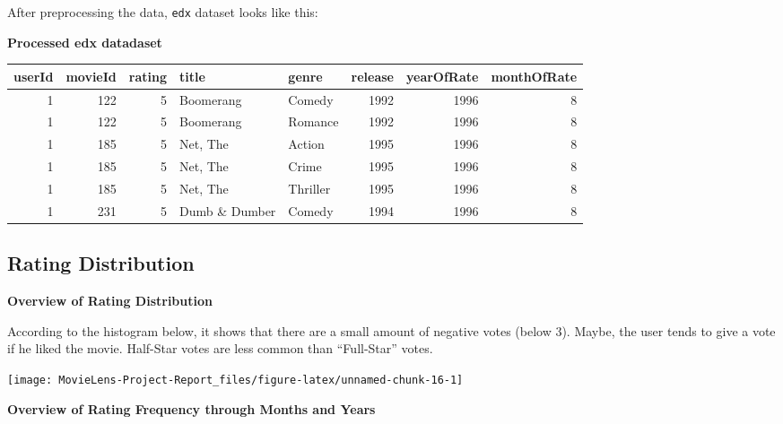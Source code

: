 \documentclass[
]{article}
\begin{document}
After preprocessing the data, \texttt{edx} dataset looks like this:

\textbf{Processed edx datadaset}

\begin{table}
\centering\begingroup\fontsize{10}{12}\selectfont

\begin{tabular}{r|r|r|l|l|r|r|r}
\hline
userId & movieId & rating & title & genre & release & yearOfRate & monthOfRate\\
\hline
1 & 122 & 5 & Boomerang & Comedy & 1992 & 1996 & 8\\
\hline
1 & 122 & 5 & Boomerang & Romance & 1992 & 1996 & 8\\
\hline
1 & 185 & 5 & Net, The & Action & 1995 & 1996 & 8\\
\hline
1 & 185 & 5 & Net, The & Crime & 1995 & 1996 & 8\\
\hline
1 & 185 & 5 & Net, The & Thriller & 1995 & 1996 & 8\\
\hline
1 & 231 & 5 & Dumb \& Dumber & Comedy & 1994 & 1996 & 8\\
\hline
\end{tabular}
\endgroup{}
\end{table}

\newpage

\hypertarget{rating-distribution}{%
\subsection{Rating Distribution}\label{rating-distribution}}

\textbf{Overview of Rating Distribution}

According to the histogram below, it shows that there are a small amount
of negative votes (below 3). Maybe, the user tends to give a vote if he
liked the movie. Half-Star votes are less common than ``Full-Star''
votes.

\begin{center}\texttt{[image: MovieLens-Project-Report\_files/figure-latex/unnamed-chunk-16-1]} \end{center}

\textbf{Overview of Rating Frequency through Months and Years}
\end{document}
